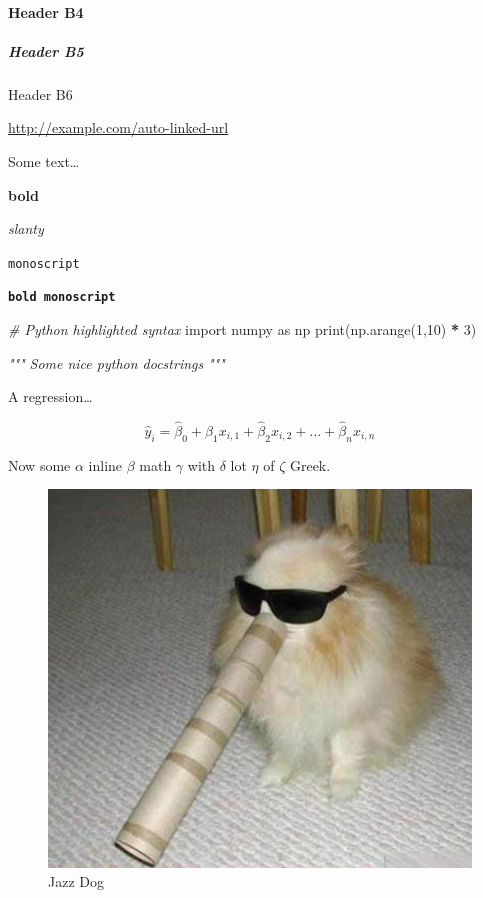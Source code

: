 \documentclass[
                ]
{article}
\newenvironment{Shaded}{\begin{snugshade}}{\end{snugshade}}
\newcommand{\BuiltInTok}[1]{#1}
\newcommand{\CommentTok}[1]{\textcolor[rgb]{0.56,0.35,0.01}{\textit{#1}}}
\newcommand{\DecValTok}[1]{\textcolor[rgb]{0.00,0.00,0.81}{#1}}
\newcommand{\ImportTok}[1]{#1}
\newcommand{\NormalTok}[1]{#1}
\newcommand{\OperatorTok}[1]{\textcolor[rgb]{0.81,0.36,0.00}{\textbf{#1}}}
\begin{document}
\hypertarget{header-b4}{%
\paragraph{Header B4}\label{header-b4}}

\hypertarget{header-b5}{%
\subparagraph{Header B5}\label{header-b5}}

Header B6

\url{http://example.com/auto-linked-url}

Some text\ldots{}

\textbf{bold}

\emph{slanty}

\texttt{monoscript}

\textbf{\texttt{bold\ monoscript}}

\begin{Shaded}
\begin{Highlighting}[]
\CommentTok{# Python highlighted syntax}
\ImportTok{import}\NormalTok{ numpy }\ImportTok{as}\NormalTok{ np}
\BuiltInTok{print}\NormalTok{(np.arange(}\DecValTok{1}\NormalTok{,}\DecValTok{10}\NormalTok{) }\OperatorTok{*} \DecValTok{3}\NormalTok{)}

\CommentTok{"""}
\CommentTok{Some nice python docstrings}
\CommentTok{"""}
\end{Highlighting}
\end{Shaded}

A regression\ldots{}

\[
\hat{y}_i = \hat{\beta}_0 + \hat{\beta}_1 x_{i,1} + \hat{\beta}_2 x_{i,2} + ... + \hat{\beta}_n x_{i,n}
\]

Now some \(\alpha\) inline \(\beta\) math \(\gamma\) with \(\delta\) lot
\(\eta\) of \(\zeta\) Greek.

\begin{figure}
\centering
\includegraphics{./jazz_dog.jpeg}
\caption{Jazz Dog}
\end{figure}
\end{document}
